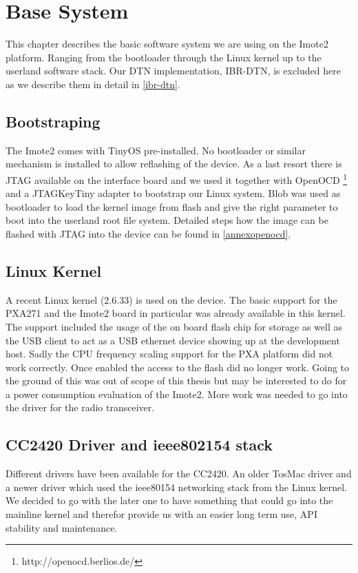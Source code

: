 \chapter{Base System}
This chapter describes the basic software system we are using on the Imote2
platform. Ranging from the bootloader through the Linux kernel up to the
userland software stack. Our DTN implementation, IBR-DTN, is excluded here as we
describe them in detail in \ref{ibr-dtn}.

\section{Bootstraping}
The Imote2 comes with TinyOS pre-installed. No bootloader or similar mechanism
is installed to allow reflashing of the device. As a last resort there is JTAG
available on the interface board and we used it together with OpenOCD
\footnote{http://openocd.berlios.de/} and a
JTAGKeyTiny adapter to bootstrap our Linux system. Blob was used as bootloader to
load the kernel image from flash and give the right parameter to boot into the
userland root file system. Detailed steps how the image can be flashed with JTAG
into the device can be found in \ref{annexopenocd}.

\section{Linux Kernel}
A recent Linux kernel (2.6.33) is used on the device. The basic support for the
PXA271 and the Imote2 board in particular was already available in this kernel.
The support included the usage of the on board flash chip for storage as well as
the USB client to act as a USB ethernet device showing up at the development host.
Sadly the CPU frequency scaling support for the PXA platform did not work
correctly. Once enabled the access to the flash did no longer work. Going to the
ground of this was out of scope of this thesis but may be interested to do for a
power consumption evaluation of the Imote2. More work was needed to go into the
driver for the radio transceiver.

\section{CC2420 Driver and ieee802154 stack}
Different drivers have been available for the CC2420. An older TosMac driver and
a newer driver which used the ieee80154 networking stack from the Linux kernel.
We decided to go with the later one to have something that could go into the
mainline kernel and therefor provide us with an easier long term use, API
stability and maintenance.

